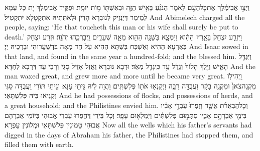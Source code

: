 {וַיְצַ֣ו אֲבִימֶ֔לֶךְ אֶת\maqqaf כׇּל\maqqaf הָעָ֖ם לֵאמֹ֑ר הַנֹּגֵ֜עַ בָּאִ֥ישׁ הַזֶּ֛ה וּבְאִשְׁתּ֖וֹ מ֥וֹת יוּמָֽת׃}
{וּפַקֵּיד אֲבִימֶלֶךְ יָת כָּל עַמָּא לְמֵימַר דְּיַנְזֵיק לְגוּבְרָא הָדֵין וּלְאִתְּתֵיהּ אִתְקְטָלָא יִתְקְטִיל׃}
{And Abimelech charged all the people, saying: ‘He that toucheth this man or his wife shall surely be put to death.’}{}
{וַיִּזְרַ֤ע יִצְחָק֙ בָּאָ֣רֶץ הַהִ֔וא וַיִּמְצָ֛א בַּשָּׁנָ֥ה הַהִ֖וא מֵאָ֣ה שְׁעָרִ֑ים וַֽיְבָרְכֵ֖הוּ יְהֹוָֽה׃}
{וּזְרַע יִצְחָק בְּאַרְעָא הַהִיא וְאַשְׁכַּח בְּשַׁתָּא הַהִיא עַל חַד מְאָה בִּדְשַׁעֲרוּהִי וּבָרְכֵיהּ יְיָ׃}
{And Isaac sowed in that land, and found in the same year a hundred-fold; and the \lord\space blessed him.}{}
{וַיִּגְדַּ֖ל הָאִ֑ישׁ וַיֵּ֤לֶךְ הָלוֹךְ֙ וְגָדֵ֔ל עַ֥ד כִּֽי\maqqaf גָדַ֖ל מְאֹֽד׃}
{וּרְבָא גּוּבְרָא וַאֲזַל אָזֵיל סָגֵי וְרָבֵי עַד דִּרְבָא לַחְדָּא׃}
{And the man waxed great, and grew more and more until he became very great.}{}
{וַֽיְהִי\maqqaf ל֤וֹ מִקְנֵה\maqqaf צֹאן֙ וּמִקְנֵ֣ה בָקָ֔ר וַעֲבֻדָּ֖ה רַבָּ֑ה וַיְקַנְא֥וּ אֹת֖וֹ פְּלִשְׁתִּֽים׃}
{וַהֲוָה לֵיהּ גֵּיתֵי עָנָא וְגֵיתֵי תּוֹרֵי וַעֲבֻדָּה סַגִּי וְקַנִּיאוּ בֵּיהּ פְּלִשְׁתָּאֵי׃}
{And he had possessions of flocks, and possessions of herds, and a great household; and the Philistines envied him.}{}
{וְכׇל\maqqaf הַבְּאֵרֹ֗ת אֲשֶׁ֤ר חָֽפְרוּ֙ עַבְדֵ֣י אָבִ֔יו בִּימֵ֖י אַבְרָהָ֣ם אָבִ֑יו סִתְּמ֣וּם פְּלִשְׁתִּ֔ים וַיְמַלְא֖וּם עָפָֽר׃}
{וְכָל בֵּירֵי דַּחֲפַרוּ עַבְדֵי אֲבוּהִי בְּיוֹמֵי אַבְרָהָם אֲבוּהִי טָמוּנִין פְּלִשְׁתָּאֵי וּמְלוֹנִין עַפְרָא׃}
{Now all the wells which his father’s servants had digged in the days of Abraham his father, the Philistines had stopped them, and filled them with earth.}{}
